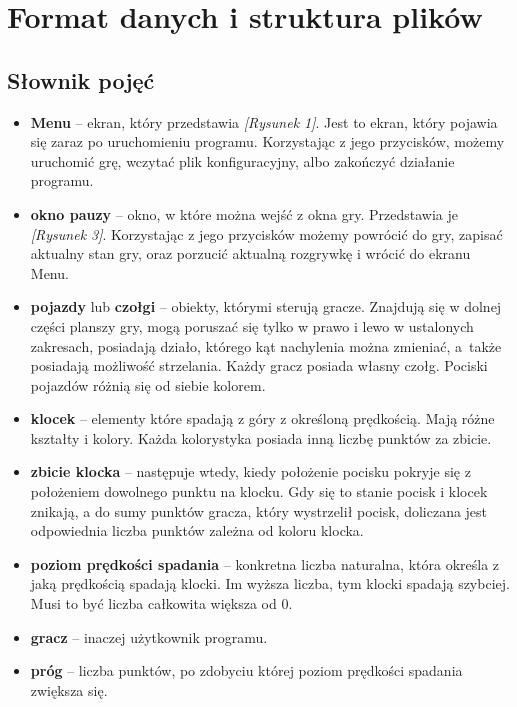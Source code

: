 \documentclass[12pt]{report}
\begin{document}
\section{Format danych i struktura plików}
\subsection{Słownik pojęć}
\begin{itemize}
    \item \textbf{Menu} – ekran, który przedstawia \textit{[Rysunek 1]}. Jest to ekran, który pojawia się zaraz po uruchomieniu programu. Korzystając z jego przycisków, możemy uruchomić grę, wczytać plik konfiguracyjny, albo zakończyć działanie programu.
    \item \textbf{okno pauzy} – okno, w które można wejść z okna gry. Przedstawia je \textit{[Rysunek 3]}. Korzystając z jego przycisków możemy powrócić do gry, zapisać aktualny stan gry, oraz porzucić aktualną rozgrywkę i wrócić do ekranu Menu.
    \item \textbf{pojazdy} lub \textbf{czołgi} – obiekty, którymi sterują gracze. Znajdują się w dolnej części planszy gry, mogą poruszać się tylko w prawo i lewo w ustalonych zakresach, posiadają działo, którego kąt nachylenia można zmieniać, a~także posiadają możliwość strzelania. Każdy gracz posiada własny czołg. Pociski pojazdów różnią się od siebie kolorem.
    \item \textbf{klocek} – elementy które spadają z góry z określoną prędkością. Mają różne kształty i kolory. Każda kolorystyka posiada inną liczbę punktów za zbicie.
    \item \textbf{zbicie klocka} – następuje wtedy, kiedy położenie pocisku pokryje się z położeniem dowolnego punktu na klocku. Gdy się to stanie pocisk i klocek znikają, a do sumy punktów gracza, który wystrzelił pocisk, doliczana jest odpowiednia liczba punktów zależna od koloru klocka.
    \item \textbf{poziom prędkości spadania} – konkretna liczba naturalna, która określa z jaką prędkością spadają klocki. Im wyższa liczba, tym klocki spadają szybciej. Musi to być liczba całkowita większa od 0.
    \item \textbf{gracz} – inaczej użytkownik programu.
    \item \textbf{próg} – liczba punktów, po zdobyciu której poziom prędkości spadania zwiększa się.
\end{itemize}
\end{document}
